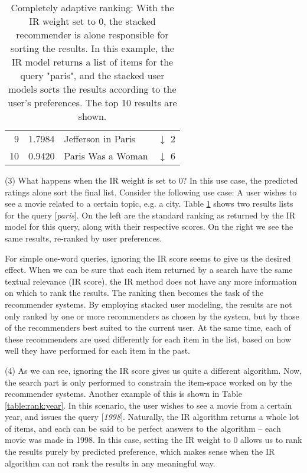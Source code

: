 \begin{table}[t]
\begin{minipage}{0.49\textwidth}
\begin{tabular*}{\textwidth}{ r l l l }
    9 & 1.7984 &  Jefferson in Paris          & \color{red} $\downarrow$ 2 \\
    10& 0.9420 &  Paris Was a Woman           & \color{red} $\downarrow$ 6 \\
    \bottomrule
  \end{tabular*}
  \end{minipage} 
  \vspace{1em}
  \caption[Completely Adaptive Ranking]{
    Completely adaptive ranking: With the IR weight set to $0$,
    the stacked recommender is alone responsible for sorting the results.
    In this example, the IR model returns a list of items for the query "paris",
    and the stacked user models sorts the results according to the user's preferences.
    The top 10 results are shown.
  }
  \label{table:rank:paris}
\end{table}


(3) What happens when the IR weight is set to $0$?
In this use case, the predicted ratings alone sort the final list.
Consider the following use case:
A user wishes to see a movie related to a certain topic, e.g. a city.
Table \ref{table:rank:paris} shows two results lists for the query [\emph{paris}].
On the left are the standard ranking as returned by the IR model for this query,
along with their respective scores.
On the right we see the same results, re-ranked by user preferences.

For simple one-word queries, ignoring the IR score seems to give us the desired effect.
When we can be sure that each item returned by a search have the same textual relevance
(IR score), the IR method does not have any more information on which to rank
the results. The ranking then becomes the task of the recommender systems.
By employing stacked user modeling, the results are not only ranked by 
one or more recommenders as chosen by the system, but by those of the recommenders
best suited to the current user. At the same time, each of these recommenders
are used differently for each item in the list, based on how well they have
performed for each item in the past.

(4) As we can see, ignoring the IR score gives us quite a different algorithm.
Now, the search part is only performed to constrain the item-space worked
on by the recommender systems.
Another example of this is shown in Table \ref{table:rank:year}.
In this scenario, the user wishes to see a movie from a certain year,
and issues the query [\emph{1998}].
Naturally, the IR algorithm returns a whole lot of items, and each can
be said to be perfect answers to the algorithm -- each movie
was made in 1998.
In this case, setting the IR weight to $0$ allows us to rank the results
purely by predicted preference, which makes sense when the IR algorithm
can not rank the results in any meaningful way.

